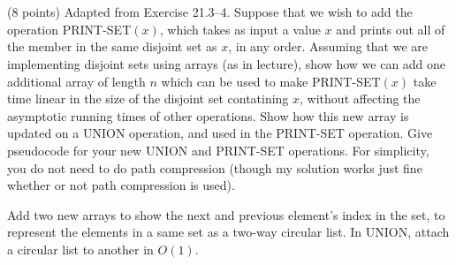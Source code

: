 \documentclass[paper=a4, fontsize=11pt]{scrartcl} %
\begin{document}
\maketitle %

\section{}

\begin{fancyquotes}
  (8 points) Adapted from Exercise 21.3--4. Suppose that we wish to add
  the operation \textsc{PRINT-SET}$(x)$, which takes as input a value
  $x$ and prints out all of the member in the same disjoint set as
  $x$, in any order. Assuming that we are implementing disjoint sets
  using arrays (as in lecture), show how we can add one additional
  array of length $n$ which can be used to make
  \textsc{PRINT-SET}$(x)$ take time linear in the size of the disjoint
  set contatining $x$, without affecting the asymptotic running times
  of other operations. Show how this new array is updated on a
  \textsc{UNION} operation, and used in the \textsc{PRINT-SET}
  operation. Give pseudocode for your new \textsc{UNION} and
  \textsc{PRINT-SET} operations. For simplicity, you do not need to do
  path compression (though my solution works just fine whether or not
  path compression is used).
\end{fancyquotes}

Add two new arrays to show the next and previous element's index in
the set, to represent the elements in a same set as a two-way circular
list. In \textsc{UNION}, attach a circular list to another in $O(1)$.

\begin{algorithm}[hp]
\end{algorithm}


\pagebreak
\end{document}
